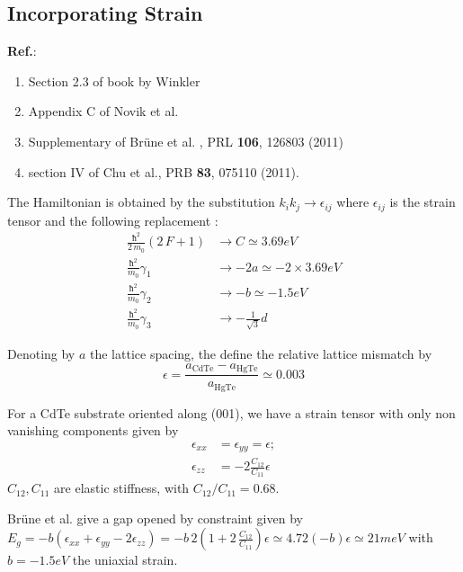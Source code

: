 \documentclass[prb,aps]{revtex4}
\begin{document}
	\subsection{Incorporating Strain}
		
		{\bf Ref.}: 
		\begin{enumerate}
			\item Section 2.3 of book by Winkler
			\item Appendix C of Novik et al.
			\item Supplementary of Brüne et al. , PRL {\bf 106}, 126803 (2011)
			\item section IV of Chu et al., PRB {\bf 83}, 075110 (2011). 
		\end{enumerate}
		
		The Hamiltonian is obtained by the substitution $k_i k_j  \to ϵ_{ij} $ where $ϵ_{ij}$ is the strain tensor 
		and the following replacement : 
		\begin{align}
			\frac{ħ^2}{2\,m_0} (2\,F+1) &\to C \simeq 3.69  eV\\
			\frac{ħ^2}{ m_0} γ_1&\to - 2 a \simeq -2 \times 3.69  eV \\
			\frac{ħ^2}{ m_0} γ_2 &\to -  b \simeq -1.5 eV \\
			\frac{ħ^2}{ m_0} γ_3&\to - \frac{1}{\sqrt{3}} d 
		\end{align}
		
		
		Denoting by $a$ the lattice spacing, the define the relative lattice mismatch by 
		\begin{equation}
		ϵ = \frac{ a_{\textrm{CdTe}} - a_{\textrm{HgTe}} } {a_{\textrm{HgTe}}} \simeq 0.003
		\end{equation}
		
        For a CdTe substrate oriented along (001), we have a strain tensor with only non vanishing components given by 
		\begin{align}
			ϵ_{xx} &= ϵ_{yy} = ϵ  ;\\ 
			ϵ_{zz} &= -2 \frac{C_{12}}{C_{11}} ϵ
		\end{align}
		$C_{12},C_{11}$ are elastic stiffness, with $C_{12}/C_{11} = 0.68$. 
		 
		Brüne et al. give a gap opened by constraint given by 
		$E_g = -b (ϵ_{xx} + ϵ_{yy} - 2 ϵ_{zz} )  = -b\,2\left(1 + 2\,\frac{C_{12}}{C_{11}}\right) ϵ \simeq 4.72 (-b)ϵ \simeq 
		21 meV$ with $b=-1.5 eV$ the uniaxial strain. 
		
\end{document}
